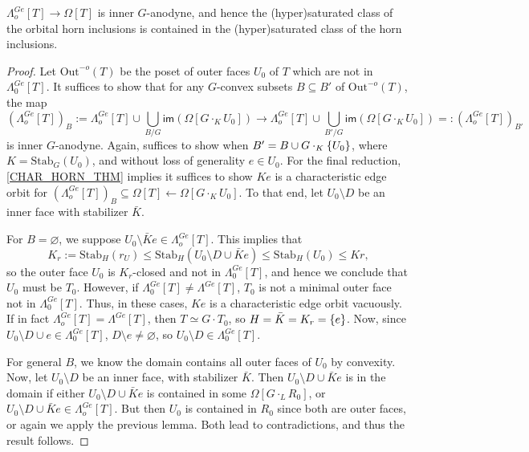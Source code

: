 \documentclass[a4paper,10pt,draft]{article}%
\numberwithin{equation}{section}%
\numberwithin{figure}{section}
\begin{document}
\begin{proposition}
      \label{ORB_HORN_THM}
      $\Lambda_o^{Ge}[T] \to \Omega[T]$ is inner $G$-anodyne, and hence
      the (hyper)saturated class of the orbital horn inclusions is contained in
      the (hyper)saturated class of the horn inclusions.
\end{proposition}
\begin{proof}
      Let $\mathrm{Out}^{-o}(T)$ be the poset of outer faces $U_0$ of $T$ which are not in $\Lambda_0^{Ge}[T]$.
      It suffices to show that for any $G$-convex subsets $B \subseteq B'$ of $\mathrm{Out}^{-o}(T)$, the map
      \begin{equation}
            \left(\Lambda^{G e}_{o}[T]\right)_B
            := \Lambda_o^{Ge}[T] \cup \mathop{\bigcup}\limits_{B/G}\mathsf{im}\left(\Omega[G \cdot_K U_0]\right)
            \to
            \Lambda_o^{Ge}[T] \cup \mathop{\bigcup}\limits_{B'/G}\mathsf{im}\left(\Omega[G \cdot_K U_0]\right)
            =: (\Lambda^{G e}_o[T])_{B'}
      \end{equation}
      is inner $G$-anodyne.
      Again, suffices to show when $B' = B \cup G \cdot_K \left\{U_0\right\}$, where $K = \mathrm{Stab}_G(U_0)$, and
      without loss of generality $e \in U_0$.
      For the final reduction, \cref{CHAR_HORN_THM} implies it suffices to show
      $K e$ is a characteristic edge orbit for
      $(\Lambda^{G e}_o[T])_B \subseteq \Omega[T] \leftarrow \Omega[G \cdot_K U_0]$.
      To that end, let $U_0 \setminus D$ be an inner face with stabilizer $\bar K$.
      
      For $B = \varnothing$, we suppose $U_0 \setminus \bar K e \in \Lambda_o^{G e}[T]$. This implies that
      \begin{equation}
            K_r := \mathrm{Stab}_H(r_U) \leq \mathrm{Stab}_H(U_0 \setminus D \cup \bar K e) \leq \mathrm{Stab}_H(U_0) \leq Kr,
      \end{equation}
      so the outer face $U_0$ is $K_r$-closed and not in $\Lambda_0^{Ge}[T]$, and hence we conclude that $U_0$ must be $T_0$.
      However, if $\Lambda^{Ge}_0[T] \neq \Lambda^{Ge}[T]$, $T_0$ is not a minimal outer face not in $\Lambda_0^{Ge}[T]$.
      Thus, in these cases, $K e$ is a characteristic edge orbit vacuously.
      If in fact $\Lambda_o^{Ge}[T] = \Lambda^{Ge}[T]$, then $T \simeq G \cdot T_0$, so $H = \bar K = K_r = \left\{e\right\}$.
      Now, since $U_0 \setminus D \cup e \in \Lambda_0^{Ge}[T]$,
      $D \setminus e \neq \varnothing$, so
      $U_0 \setminus D \in \Lambda_0^{Ge}[T]$.
      
      For general $B$, we know the domain contains all outer faces of $U_0$ by convexity.
      Now, let $U_0 \setminus D$ be an inner face, with stabilizer $\bar K$.
      Then $U_0 \setminus D \cup \bar K e$ is in the domain if either
      $U_0 \setminus D \cup \bar K e$ is contained in some $\Omega[G \cdot_L R_0]$, or
      $U_0 \setminus D \cup \bar K e \in \Lambda_o^{Ge}[T]$.
      But then $U_0$ is contained in $R_0$ since both are outer faces, or again we apply the previous lemma.
      Both lead to contradictions, and thus the result follows.
\end{proof}
\end{document}
